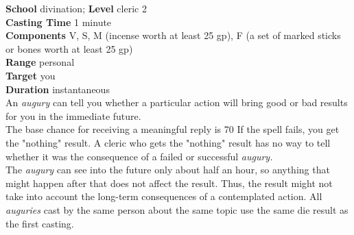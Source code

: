 \textbf{School} divination; \textbf{Level} cleric 2\\
\textbf{Casting Time} 1 minute\\
\textbf{Components} V, S, M (incense worth at least 25 gp), F (a set of marked sticks or bones worth at least 25 gp)\\
\textbf{Range} personal\\
\textbf{Target} you\\
\textbf{Duration} instantaneous\\
An \textit{augury }can tell you whether a particular action will bring good or bad results for you in the immediate future.\\
The base chance for receiving a meaningful reply is 70%
If the spell fails, you get the "nothing" result. A cleric who gets the "nothing" result has no way to tell whether it was the consequence of a failed or successful \textit{augury.}\\
The \textit{augury }can see into the future only about half an hour, so anything that might happen after that does not affect the result. Thus, the result might not take into account the long-term consequences of a contemplated action. All \textit{auguries }cast by the same person about the same topic use the same die result as the first casting.\\

